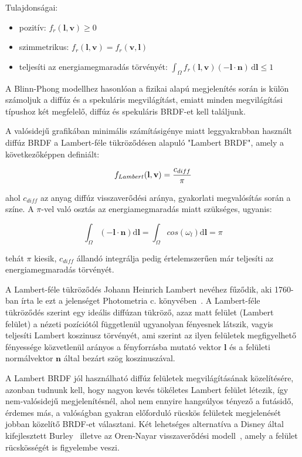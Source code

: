 Tulajdonságai:

\begin{itemize}[noitemsep]
\item pozitív: \(f_r(\mathbf{l},\mathbf{v}) \geq 0\)
\item szimmetrikus: \(f_r(\mathbf{l},\mathbf{v}) = f_r(\mathbf{v},\mathbf{l})\)
\item teljesíti az energiamegmaradás törvényét: \(\int_\Omega f_r(\mathbf{l},\mathbf{v}) (-\mathbf{l} \cdot \mathbf{n})\,\mathrm{d}\mathbf{l} \leq 1\)
\end{itemize}

A Blinn-Phong modellhez hasonlóan a fizikai alapú megjelenítés során is külön számoljuk a diffúz és a spekuláris megvilágítást, emiatt minden megvilágítási típushoz két megfelelő, diffúz és spekuláris BRDF-et kell találjunk.

A valósidejű grafikában minimális számításigénye miatt leggyakrabban használt diffúz BRDF a Lambert-féle tükröződésen alapuló "Lambert BRDF", amely a következőképpen definiált:

\[
f_{Lambert}(\mathbf{l}, \mathbf{v}) = { c_{diff} \over \pi }
\]

ahol \(c_{diff}\) az anyag diffúz visszaverődési aránya, gyakorlati megvalósítás során a színe. A \(\pi\)-vel való osztás az energiamegmaradás miatt szükséges, ugyanis:

\[
\int_\Omega { (-\mathbf{l} \cdot \mathbf{n}) \mathrm{d}\mathbf{l} } = \int_\Omega { cos(\omega_l) \mathrm{d}\mathbf{l} } = \pi
\]

tehát \(\pi\) kiesik, \(c_{diff}\) állandó integrálja pedig értelemszerűen már teljesíti az energiamegmaradás törvényét.

A Lambert-féle tükröződés Johann Heinrich Lambert nevéhez fűződik, aki 1760-ban írta le ezt a jelenséget Photometria c. könyvében~\cite{klett1760ih}. A Lambert-féle tükröződés szerint egy ideális diffúzan tükröző, azaz matt felület (Lambert felület) a nézeti pozíciótól függetlenül ugyanolyan fényesnek látszik, vagyis teljesíti Lambert koszinusz törvényét, ami szerint az ilyen felületek megfigyelhető fényessége közvetlenül arányos a fényforrásba mutató vektor \(\mathbf{l}\) és a felületi normálvektor \(\mathbf{n}\) által bezárt szög koszinuszával.

A Lambert BRDF jól használható diffúz felületek megvilágításának közelítésére, azonban tudnunk kell, hogy nagyon kevés tökéletes Lambert felület létezik, így nem-valósidejű megjelenítésnél, ahol nem ennyire hangsúlyos tényező a futásidő, érdemes más, a valóságban gyakran előforduló rücskös felületek megjelenését jobban közelítő BRDF-et választani. Két lehetséges alternatíva a Disney által kifejlesztett Burley~\cite{burley2012physically} illetve az Oren-Nayar visszaverődési modell~\cite{oren1994generalization}, amely a felület rücskösségét is figyelembe veszi.

